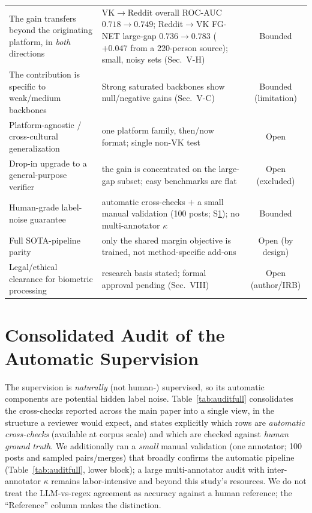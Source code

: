 \documentclass[journal]{IEEEtran}
\begin{document}
\begin{table}[!t]
\begin{tabular}{@{}p{}p{}c@{}}
The gain transfers beyond the originating platform, in \emph{both} directions &
VK$\to$Reddit overall ROC-AUC $0.718\!\to\!0.749$; Reddit$\to$VK FG-NET large-gap $0.736\!\to\!0.783$ ($+0.047$ from a 220-person source); small, noisy sets (Sec.~V-H) & Bounded \\
The contribution is specific to weak/medium backbones &
Strong saturated backbones show null/negative gains (Sec.~V-C) & Bounded (limitation) \\
Platform-agnostic / cross-cultural generalization & one platform family, then/now format; single non-VK test & Open \\
Drop-in upgrade to a general-purpose verifier & the gain is concentrated on the large-gap subset; easy benchmarks are flat & Open (excluded) \\
Human-grade label-noise guarantee & automatic cross-checks $+$ a small manual validation (100 posts; S\ref{sec:audit}); no multi-annotator $\kappa$ & Bounded \\
Full SOTA-pipeline parity & only the shared margin objective is trained, not method-specific add-ons & Open (by design) \\
Legal/ethical clearance for biometric processing & research basis stated; formal approval pending (Sec.~VIII) & Open (author/IRB) \\
\bottomrule
\end{tabular}
\end{table}

\section{Consolidated Audit of the Automatic Supervision}\label{sec:audit}
The supervision is \emph{naturally} (not human-) supervised, so its automatic components are potential
hidden label noise. Table~\ref{tab:auditfull} consolidates the cross-checks reported across the main
paper into a single view, in the structure a reviewer would expect, and states explicitly which rows
are \emph{automatic cross-checks} (available at corpus scale) and which are checked against \emph{human
ground truth}. We additionally ran a \emph{small} manual validation (one annotator; 100 posts and
sampled pairs/merges) that broadly confirms the automatic pipeline (Table~\ref{tab:auditfull}, lower
block); a large multi-annotator audit with inter-annotator $\kappa$ remains labor-intensive and beyond
this study's resources. We do not treat the LLM-vs-regex agreement as accuracy against a human reference;
the ``Reference'' column makes the distinction.
\end{document}
